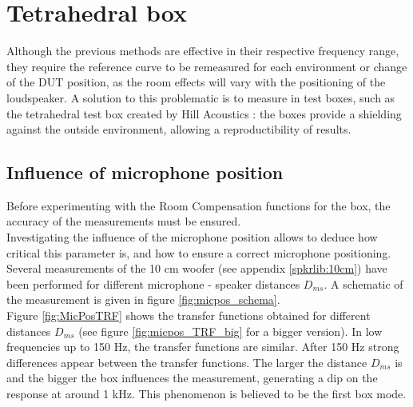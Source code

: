 \documentclass{report}
\begin{document}
\section{Tetrahedral box}
Although the previous methods are effective in their respective frequency range, they require the reference curve to be remeasured for each environment or change of the DUT position, as the room effects will vary with the positioning of the loudspeaker. A solution to this problematic is to measure in test boxes, such as the tetrahedral test box created by Hill Acoustics \citep[see][]{tetbox}: the boxes provide a shielding against the outside environment, allowing a reproductibility of results. 

\subsection{Influence of microphone position}

Before experimenting with the Room Compensation functions for the box, the accuracy of the measurements must be ensured.\\ 
Investigating the influence of the microphone position allows to deduce how critical this parameter is, and how to ensure a correct microphone positioning. Several measurements of the 10 cm woofer (see appendix \ref{spkrlib:10cm}) have been performed for different microphone - speaker distances $D_{ms}$. A schematic of the measurement is given in figure \ref{fig:micpos_schema}.  \\

Figure \ref{fig:MicPosTRF} shows the transfer functions obtained for different distances $D_{ms}$ (see figure \ref{fig:micpos_TRF_big} for a bigger version). In low frequencies up to 150 Hz, the transfer functions are similar. After 150 Hz strong differences appear between the transfer functions. The larger the distance $D_{ms}$ is and the bigger the box influences the measurement, generating a dip on the response at around 1 kHz. This phenomenon is believed to be the first box mode. \\
\end{document}
